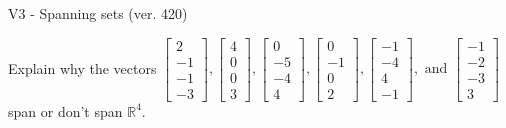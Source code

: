 \begin{exercise}
  \begin{exerciseTitle}V3 - Spanning sets (ver. 420)\end{exerciseTitle}
  \begin{exerciseStatement}
    Explain why the vectors \(\left[\begin{array}{r}
2 \\
-1 \\
-1 \\
-3
\end{array}\right] , \left[\begin{array}{r}
4 \\
0 \\
0 \\
3
\end{array}\right] , \left[\begin{array}{r}
0 \\
-5 \\
-4 \\
4
\end{array}\right] , \left[\begin{array}{r}
0 \\
-1 \\
0 \\
2
\end{array}\right] , \left[\begin{array}{r}
-1 \\
-4 \\
4 \\
-1
\end{array}\right] , \text{ and } \left[\begin{array}{r}
-1 \\
-2 \\
-3 \\
3
\end{array}\right]\) span or don't span \(\mathbb{R}^4\). 
	



\end{exerciseStatement}
\end{exercise}
